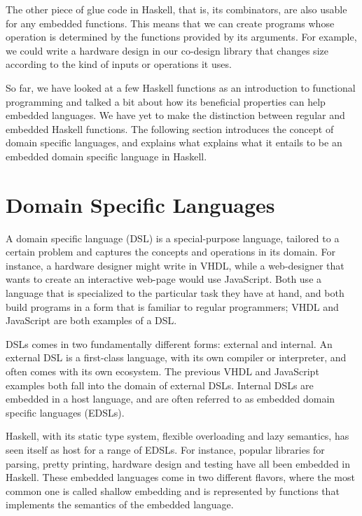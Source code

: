 \documentclass[../main.tex]{subfiles}
\begin{document}
The other piece of glue code in Haskell, that is, its combinators, are also usable for any embedded functions. This means that we can create programs whose operation is determined by the functions provided by its arguments. For example, we could write a hardware design in our co-design library that changes size according to the kind of inputs or operations it uses.

So far, we have looked at a few Haskell functions as an introduction to functional programming and talked a bit about how its beneficial properties can help embedded languages. We have yet to make the distinction between regular and embedded Haskell functions. The following section introduces the concept of domain specific languages, and explains what explains what it entails to be an embedded domain specific language in Haskell.

\section{Domain Specific Languages}
\label{domain}

A domain specific language (DSL) is a special-purpose language, tailored to a certain problem and captures the concepts and operations in its domain. For instance, a hardware designer might write in VHDL, while a web-designer that wants to create an interactive web-page would use JavaScript. Both use a language that is specialized to the particular task they have at hand, and both build programs in a form that is familiar to regular programmers; VHDL and JavaScript are both examples of a DSL.

DSLs comes in two fundamentally different forms: external and internal. An external DSL is a first-class language, with its own compiler or interpreter, and often comes with its own ecosystem. The previous VHDL and JavaScript examples both fall into the domain of external DSLs. Internal DSLs are embedded in a host language, and are often referred to as embedded domain specific languages (EDSLs).


Haskell, with its static type system, flexible overloading and lazy semantics, has seen itself as host for a range of EDSLs. For instance, popular libraries for parsing, pretty printing, hardware design and testing have all been embedded in Haskell. These embedded languages come in two different flavors, where the most common one is called shallow embedding and is represented by functions that implements the semantics of the embedded language.
\end{document}
